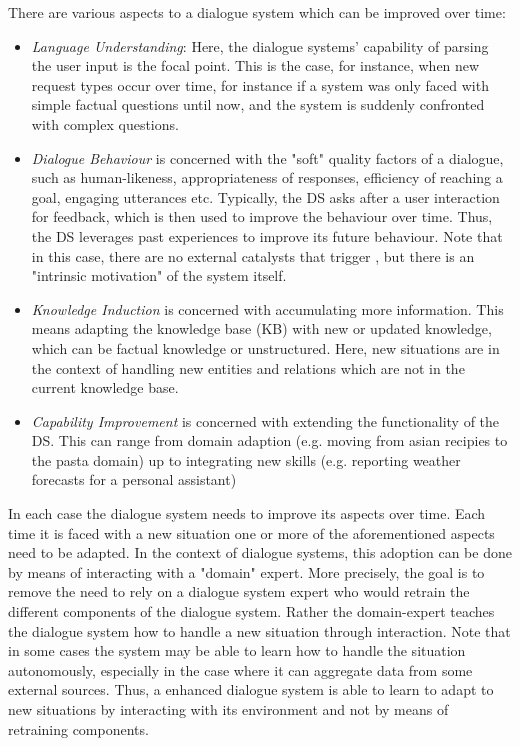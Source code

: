\documentclass{lihlith}
\theoremstyle{definition}
\theoremstyle{remark}
\begin{document}
There are various aspects to a dialogue system which can be improved over time:
\begin{itemize}
    \item \emph{Language Understanding}: Here, the dialogue systems' capability of parsing the user input is the focal point. This is the case, for instance, when new request types occur over time, for instance if a system was only faced with simple factual questions until now, and the system is suddenly confronted with complex questions. 
    \item \emph{Dialogue Behaviour} is concerned with the "soft" quality factors of a dialogue, such as human-likeness, appropriateness of responses, efficiency of reaching a goal, engaging utterances etc. Typically, the DS asks after a user interaction for feedback, which is then used to improve the behaviour over time. Thus, the DS leverages past experiences to improve its future behaviour. Note that in this case, there are no external catalysts that trigger \LLL, but there is an "intrinsic motivation" of the system itself. 
    \item \emph{Knowledge Induction} is concerned with accumulating more information. This means adapting the knowledge base (KB) with new or updated knowledge, which can be factual knowledge or unstructured. Here, new situations are in the context of handling new entities and relations which are not in the current knowledge base. 
    \item \emph{Capability Improvement} is concerned with extending the functionality of the DS. This can range from domain adaption (e.g. moving from asian recipies to the pasta domain) up to integrating new skills (e.g. reporting weather forecasts for a personal assistant) 
\end{itemize}

In each case the dialogue system needs to improve its aspects over time. Each time it is faced with a new situation one or more of the aforementioned aspects need to be adapted.
In the context of dialogue systems, this adoption can be done by means of interacting with a "domain" expert. More precisely, the goal is to remove the need to rely on a dialogue system expert who would retrain the different components of the dialogue system. Rather the domain-expert teaches the dialogue system how to handle a new situation through interaction. Note that in some cases the system may be able to learn how to handle the situation autonomously, especially in the case where it can aggregate data from some external sources. 
Thus, a \LLL enhanced dialogue system is able to learn to adapt to new situations by interacting with its environment and not by means of retraining components. 
\end{document}
